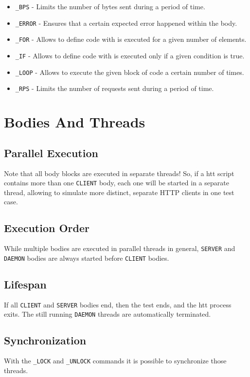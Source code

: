 \begin{itemize}
\item \texttt{\_BPS} - Limits the number of bytes sent during a period of time.
\item \texttt{\_ERROR} - Ensures that a certain expected error happened within the body.
\item \texttt{\_FOR} - Allows to define code with is executed for a given number of elements.
\item \texttt{\_IF} - Allows to define code with is executed only if a given condition is true.
\item \texttt{\_LOOP} - Allows to execute the given block of code a certain number of times.
\item \texttt{\_RPS} - Limits the number of requests sent during a period of time.
\end{itemize}


\newpage 
\section{Bodies And Threads}

\subsection{Parallel Execution}
Note that all body blocks are executed in separate threads! So, if a htt 
script contains more than one \texttt{CLIENT} body, each one will be started in a 
separate thread, allowing to simulate more distinct, separate HTTP clients in 
one test case.

\subsection{Execution Order}
While multiple bodies are executed in parallel threads in general, \texttt{SERVER}
and \texttt{DAEMON} bodies are always started before \texttt{CLIENT} bodies.

\subsection{Lifespan}
If all \texttt{CLIENT} and \texttt{SERVER} bodies end, then
the test ends, and the htt process exits. The still running \texttt{DAEMON} threads are
automatically terminated.

\subsection{Synchronization}
With the \texttt{\_LOCK} and \texttt{\_UNLOCK} commands it is possible to
synchronize those threads. 


